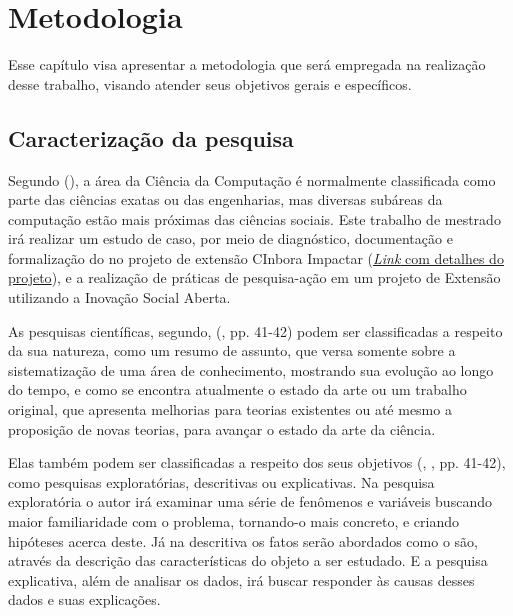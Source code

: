 \chapter{Metodologia}
\label{chap:metodologia}

Esse capítulo visa apresentar a metodologia que será empregada na realização desse trabalho, visando atender seus objetivos gerais e específicos.

\section{Caracterização da pesquisa}
Segundo \citeauthor{wazlawick2014} (\citeyear{wazlawick2014}), a área da Ciência da Computação é normalmente classificada como parte das ciências exatas ou das engenharias, mas diversas subáreas da computação estão mais próximas das ciências sociais. Este trabalho de mestrado irá realizar um estudo de caso, por meio de diagnóstico, documentação e formalização do no projeto de extensão CInbora Impactar (\href{https://sigaa.ufpe.br/sigaa/link/public/extensao/visualizacaoAcaoExtensao/1971}{\textit{Link} com detalhes do projeto}), e a realização de práticas de pesquisa-ação em um projeto de Extensão utilizando a Inovação Social Aberta.

As pesquisas científicas, segundo, \citeauthor{wazlawick2014} (\citeyear{wazlawick2014}, pp. 41-42) podem ser classificadas a respeito da sua natureza, como um resumo de assunto, que versa somente sobre a sistematização de uma área de conhecimento, mostrando sua evolução ao longo do tempo, e como se encontra atualmente o estado da arte ou um trabalho original, que apresenta melhorias para teorias existentes ou até mesmo a proposição de novas teorias, para avançar o estado da arte da ciência.

Elas também podem ser classificadas a respeito dos seus objetivos (\citeauthor{gil2002}, \citeyear{gil2002}, pp. 41-42), como pesquisas exploratórias, descritivas ou explicativas. Na pesquisa exploratória o autor irá examinar uma série de fenômenos e variáveis buscando maior familiaridade com o problema, tornando-o mais concreto, e criando hipóteses acerca deste. Já na descritiva os fatos serão abordados como o são, através da descrição das características do objeto a ser estudado. E a pesquisa explicativa, além de analisar os dados, irá buscar responder às causas desses dados e suas explicações.

